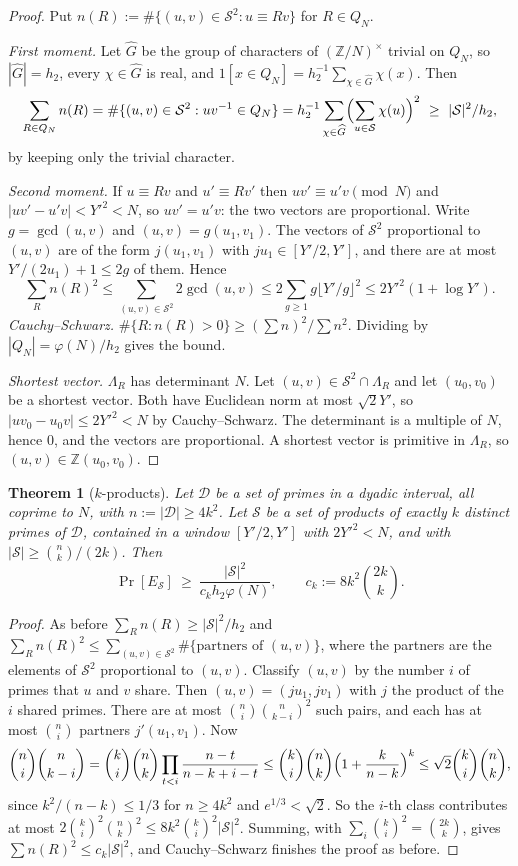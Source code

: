 \documentclass[11pt]{amsart}
\newtheorem{theorem}{Theorem}[section]
\theoremstyle{definition}
\newcommand{\Z}{\mathbb{Z}}
\newcommand{\cD}{\mathcal{D}}
\newcommand{\cS}{\mathcal{S}}
\newcommand{\Prob}{\Pr}
\begin{document}
\begin{proof}
Put $n(R):=\#\{(u,v)\in\cS^2:u\equiv Rv\}$ for $R\in Q_N$.

\emph{First moment.} Let $\widehat G$ be the group of characters of $(\Z/N)^\times$ trivial on $Q_N$, so $|\widehat G|=h_2$, every
$\chi\in\widehat G$ is real, and $1[x\in Q_N]=h_2^{-1}\sum_{\chi\in\widehat G}\chi(x)$. Then
\[
\sum_{R\in Q_N}n(R)=\#\{(u,v)\in\cS^2:uv^{-1}\in Q_N\}=h_2^{-1}\sum_{\chi\in\widehat G}\Bigl(\sum_{u\in\cS}\chi(u)\Bigr)^2\ \ge\ |\cS|^2/h_2,
\]
by keeping only the trivial character.

\emph{Second moment.} If $u\equiv Rv$ and $u'\equiv Rv'$ then $uv'\equiv u'v\pmod N$ and $|uv'-u'v|<Y'^2<N$, so $uv'=u'v$:
the two vectors are proportional. Write $g=\gcd(u,v)$ and $(u,v)=g(u_1,v_1)$. The vectors of $\cS^2$
proportional to $(u,v)$ are of the form $j(u_1,v_1)$ with $ju_1\in[Y'/2,Y']$, and there are at most $Y'/(2u_1)+1\le2g$ of
them. Hence
\[
\sum_{R}n(R)^2\le\sum_{(u,v)\in\cS^2}2\gcd(u,v)\le2\sum_{g\ge1}g\lfloor Y'/g\rfloor^2\le2Y'^2(1+\log Y').
\]
\emph{Cauchy--Schwarz.} $\#\{R:n(R)>0\}\ge(\sum n)^2/\sum n^2$. Dividing by $|Q_N|=\varphi(N)/h_2$ gives the bound.

\emph{Shortest vector.} $\Lambda_R$ has determinant $N$. Let $(u,v)\in\cS^2\cap\Lambda_R$ and let $(u_0,v_0)$ be a shortest vector. Both have
Euclidean norm at most $\sqrt2Y'$, so $|uv_0-u_0v|\le2Y'^2<N$ by Cauchy--Schwarz. The determinant is a multiple of $N$, hence $0$,
and the vectors are proportional. A shortest vector is primitive in $\Lambda_R$, so $(u,v)\in\Z(u_0,v_0)$.
\end{proof}

\begin{theorem}[$k$-products]\label{thm:Sprime}
Let $\cD$ be a set of primes in a dyadic interval, all coprime to $N$, with $n:=|\cD|\ge4k^2$. Let $\cS$ be a set of
products of exactly $k$ distinct primes of $\cD$, contained in a window $[Y'/2,Y']$ with $2Y'^2<N$, and
with $|\cS|\ge\binom nk/(2k)$. Then
\[
\Prob[E_\cS]\ \ge\ \frac{|\cS|^2}{c_kh_2\varphi(N)},\qquad c_k:=8k^2\binom{2k}{k}.
\]
\end{theorem}

\begin{proof}
As before $\sum_Rn(R)\ge|\cS|^2/h_2$ and $\sum_Rn(R)^2\le\sum_{(u,v)\in\cS^2}\#\{\text{partners of }(u,v)\}$, where the partners are the elements of
$\cS^2$ proportional to $(u,v)$. Classify $(u,v)$ by the number $i$ of primes that $u$ and $v$ share. Then
$(u,v)=(ju_1,jv_1)$ with $j$ the product of the $i$ shared primes. There are at most $\binom ni\binom n{k-i}^2$ such pairs,
and each has at most $\binom ni$ partners $j'(u_1,v_1)$. Now
\[
\binom ni\binom n{k-i}=\binom ki\binom nk\prod_{t<i}\frac{n-t}{n-k+i-t}\le\binom ki\binom nk\Bigl(1+\frac k{n-k}\Bigr)^k\le\sqrt2\binom ki\binom nk,
\]
since $k^2/(n-k)\le1/3$ for $n\ge4k^2$ and $e^{1/3}<\sqrt2$. So the $i$-th class contributes at most
$2\binom ki^2\binom nk^2\le8k^2\binom ki^2|\cS|^2$. Summing, with $\sum_i\binom ki^2=\binom{2k}k$, gives $\sum n(R)^2\le c_k|\cS|^2$, and
Cauchy--Schwarz finishes the proof as before.
\end{proof}
\end{document}
